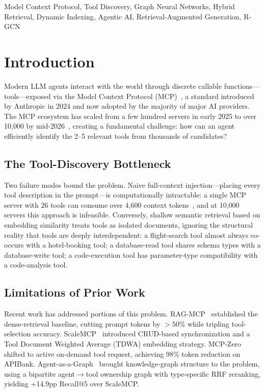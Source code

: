 \documentclass[conference]{IEEEtran}
\begin{document}
\begin{IEEEkeywords}
Model Context Protocol, Tool Discovery, Graph Neural Networks,
Hybrid Retrieval, Dynamic Indexing, Agentic AI,
Retrieval-Augmented Generation, R-GCN
\end{IEEEkeywords}

\section{Introduction}

Modern LLM agents interact with the world through discrete callable
functions---tools---exposed via the Model Context Protocol
(MCP)~\cite{anthropic2024mcp}, a standard introduced by Anthropic in
2024 and now adopted by the majority of major AI providers. The MCP
ecosystem has scaled from a few hundred servers in early 2025 to over
10,000 by mid-2026~\cite{fei2025mcpzero}, creating a fundamental
challenge: how can an agent efficiently identify the 2--5 relevant
tools from thousands of candidates?

\subsection{The Tool-Discovery Bottleneck}

Two failure modes bound the problem. Naive full-context
injection---placing every tool description in the prompt---is
computationally intractable: a single MCP server with 26 tools can
consume over 4,600 context tokens~\cite{gan2025ragmcp}, and at
10,000 servers this approach is infeasible. Conversely, shallow
semantic retrieval based on embedding similarity treats tools as
isolated documents, ignoring the structural reality that tools are
deeply interdependent: a flight-search tool almost always co-occurs
with a hotel-booking tool; a database-read tool shares schema types
with a database-write tool; a code-execution tool has parameter-type
compatibility with a code-analysis tool.

\subsection{Limitations of Prior Work}

Recent work has addressed portions of this problem.
RAG-MCP~\cite{gan2025ragmcp} established the dense-retrieval
baseline, cutting prompt tokens by $>50\%$ while tripling
tool-selection accuracy. ScaleMCP~\cite{lumer2025scalemcp} introduced
CRUD-based synchronization and a Tool Document Weighted Average
(TDWA) embedding strategy. MCP-Zero~\cite{fei2025mcpzero} shifted to
active on-demand tool request, achieving 98\% token reduction on
APIBank. Agent-as-a-Graph~\cite{nizar2025agentgraph} brought
knowledge-graph structure to the problem, using a bipartite
agent$\to$tool ownership graph with type-specific RRF reranking,
yielding +14.9pp Recall@5 over ScaleMCP.
\end{document}

